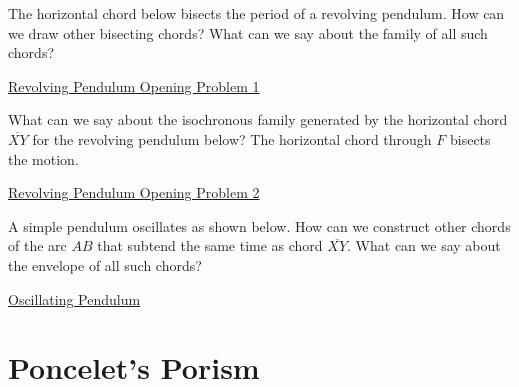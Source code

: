 \documentclass{ximera}
\begin{document}
\begin{exploration}
The horizontal chord below bisects the period of a revolving pendulum. How can we draw other bisecting chords? What can we say about the family of all such chords?

\begin{onlineOnly}
    \begin{center}
\end{center}
\end{onlineOnly}

\href{https://www.desmos.com/calculator/x5fzsfvxdb}{Revolving Pendulum Opening Problem 1}

\end{exploration}

\begin{exploration}
What can we say about the isochronous family generated by the horizontal chord $\overline{XY}$ for the revolving pendulum below? The horizontal chord through $F$ bisects the motion.

\begin{onlineOnly}
    \begin{center}
\end{center}
\end{onlineOnly}

\href{https://www.desmos.com/calculator/1kyfdn6yyc}{Revolving Pendulum Opening Problem 2}

\end{exploration}


\begin{exploration}
A simple pendulum oscillates as shown below. How can we construct other chords of the arc $AB$ that subtend the same time as chord $\overline{XY}$. What can we say about the envelope of all such chords?

\begin{onlineOnly}
    \begin{center}
\end{center}
\end{onlineOnly}

\href{https://www.desmos.com/calculator/pleca0vkjw}{Oscillating Pendulum}

\end{exploration}



\section*{Poncelet's Porism}
\end{document}
